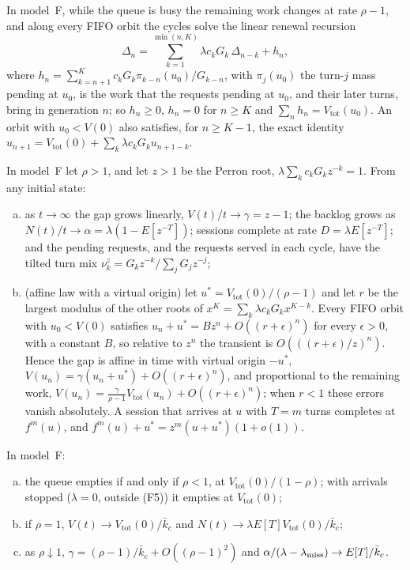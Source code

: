 \begin{lemma}\label{lem:recursion}
In model~F, while the queue is busy the remaining work changes at rate $\rho-1$, and along every FIFO orbit the cycles solve the
linear renewal recursion
\begin{equation}\label{eq:renewal}
\Delta_n=\sum_{k=1}^{\min(n,K)}\lambda c_kG_k\,\Delta_{n-k}+h_n ,
\end{equation}
where $h_n=\sum_{k=n+1}^{K}c_kG_k\pi_{k-n}(u_0)/G_{k-n}$, with $\pi_j(u_0)$ the turn-$j$ mass pending at $u_0$, is the work
that the requests pending at $u_0$, and their later turns, bring in generation $n$; so $h_n\ge0$, $h_n=0$ for $n\ge K$ and
$\sum_nh_n=V_{\mathrm{tot}}(u_0)$. An orbit with $u_0<V(0)$ also satisfies, for $n\ge K-1$, the exact identity
$u_{n+1}=V_{\mathrm{tot}}(0)+\sum_k\lambda c_kG_ku_{n+1-k}$.
\end{lemma}

\begin{theorem}\label{thm:trap}
In model~F let $\rho>1$, and let $z>1$ be the Perron root, $\lambda\sum_kc_kG_kz^{-k}=1$. From any initial state:
\begin{enumerate}[(a),leftmargin=*,nosep]
\item as $t\to\infty$ the gap grows linearly, $V(t)/t\to\gamma=z-1$; the backlog grows as $N(t)/t\to\alpha=\lambda(1-E[z^{-T}])$;
sessions complete at rate $D=\lambda E[z^{-T}]$; and the pending requests, and the requests served in each cycle, have the tilted
turn mix $\nu^z_k=G_kz^{-k}/\sum_jG_jz^{-j}$;
\item (affine law with a virtual origin) let $u^*=V_{\mathrm{tot}}(0)/(\rho-1)$ and let $r$ be the largest modulus of the other roots
of $x^K=\sum_k\lambda c_kG_kx^{K-k}$. Every FIFO orbit with $u_0<V(0)$ satisfies $u_n+u^*=Bz^n+O((r+\epsilon)^n)$ for every
$\epsilon>0$, with a constant $B$, so relative to $z^n$ the transient is $O(((r+\epsilon)/z)^n)$. Hence the gap is affine in time with
virtual origin $-u^*$, $V(u_n)=\gamma(u_n+u^*)+O((r+\epsilon)^n)$, and proportional to the remaining work,
$V(u_n)=\frac{\gamma}{\rho-1}V_{\mathrm{tot}}(u_n)+O((r+\epsilon)^n)$; when $r<1$ these errors vanish absolutely. A session that
arrives at $u$ with $T=m$ turns completes at $f^m(u)$, and $f^m(u)+u^*=z^m(u+u^*)(1+o(1))$.
\end{enumerate}
\end{theorem}

\begin{proposition}\label{prop:classic}
In model~F:
\begin{enumerate}[(a),leftmargin=*,nosep]
\item the queue empties if and only if $\rho<1$, at $V_{\mathrm{tot}}(0)/(1-\rho)$; with arrivals stopped ($\lambda=0$, outside (F5)) it
empties at $V_{\mathrm{tot}}(0)$;
\item if $\rho=1$, $V(t)\to V_{\mathrm{tot}}(0)/\bar k_c$ and $N(t)\to\lambda E[T]V_{\mathrm{tot}}(0)/\bar k_c$;
\item as $\rho\downarrow1$, $\gamma=(\rho-1)/\bar k_c+O((\rho-1)^2)$ and $\alpha/(\lambda-\lambda_{\mathrm{miss}})\to E[T]/\bar k_c$.
\end{enumerate}
\end{proposition}

